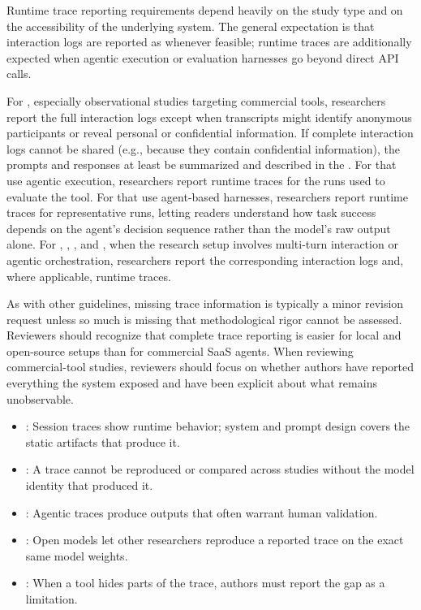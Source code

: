 
Runtime trace reporting requirements depend heavily on the study type and on the accessibility of the underlying system.
The general expectation is that interaction logs are reported as \supplementarymaterial whenever feasible; runtime traces are additionally expected when agentic execution or evaluation harnesses go beyond direct API calls.

For \llmusage, especially observational studies targeting commercial tools, researchers \must report the full interaction logs except when transcripts might identify anonymous participants or reveal personal or confidential information.
If complete interaction logs cannot be shared (e.g., because they contain confidential information), the prompts and responses \must at least be summarized and described in the \paper.
For \newtools that use agentic execution, researchers \should report runtime traces for the runs used to evaluate the tool.
For \benchmarkingtasks that use agent-based harnesses, researchers \should report runtime traces for representative runs, letting readers understand how task success depends on the agent's decision sequence rather than the model's raw output alone.
For \annotators, \judges, \synthesis, and \subjects, when the research setup involves multi-turn interaction or agentic orchestration, researchers \should report the corresponding interaction logs and, where applicable, runtime traces.


As with other guidelines, missing trace information is typically a minor revision request unless so much is missing that methodological rigor cannot be assessed.
Reviewers should recognize that complete trace reporting is easier for local and open-source setups than for commercial SaaS agents.
When reviewing commercial-tool studies, reviewers should focus on whether authors have reported everything the system exposed and have been explicit about what remains unobservable.

\begin{itemize}[label=$\rightarrow$]
    \item \seedesign: Session traces show runtime behavior; system and prompt design covers the static artifacts that produce it.
    \item \seemodelversion: A trace cannot be reproduced or compared across studies without the model identity that produced it.
    \item \seehumanvalidation: Agentic traces produce outputs that often warrant human validation.
    \item \seeopenllm: Open models let other researchers reproduce a reported trace on the exact same model weights.
    \item \seelimitationsmitigations: When a tool hides parts of the trace, authors must report the gap as a limitation.
\end{itemize}
